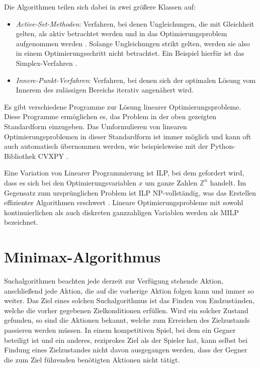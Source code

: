 Die Algorithmen teilen sich dabei in zwei größere Klassen auf:

\begin{itemize}
    \item \emph{Active-Set-Methoden}: Verfahren, bei denen Ungleichungen, die mit Gleichheit gelten, als aktiv betrachtet werden und in das Optimierungsproblem aufgenommen werden \cite[S. 243]{2023.OptimizationLectureNotes}. Solange Ungleichungen strikt gelten, werden sie also in einem Optimierungsschritt nicht betrachtet. Ein Beispiel hierfür ist das Simplex-Verfahren \cite[S. 248]{2023.OptimizationLectureNotes}.
    \item \emph{Innere-Punkt-Verfahren}: Verfahren, bei denen sich der optimalen Lösung vom Innerem des zulässigen Bereichs iterativ angenähert wird. \cite[S. 261]{2023.InteriorPoint}
\end{itemize}

Es gibt verschiedene Programme zur Lösung linearer Optimierungsprobleme. Diese Programme ermöglichen es, das Problem in der oben gezeigten Standardform einzugeben. Das Umformulieren von linearen Optimierungsproblemen in dieser Standardform ist immer möglich und kann oft auch automatisch übernommen werden, wie beispielsweise mit der Python-Bibliothek CVXPY \cite[S. 1]{2016.CVXPY}.

Eine Variation von Linearer Programmierung ist \ac{ILP}, bei dem gefordert wird, dass es sich bei den Optimierungsvariablen $x$ um ganze Zahlen $\mathbb{Z}^{n}$ handelt. Im Gegensatz zum ursprünglichen Problem ist \ac{ILP} NP-vollständig, was das Erstellen effizienter Algorithmen erschwert \cite[S. 173]{2002.MathProgramming}. Lineare Optimierungsprobleme mit sowohl kontinuierlichen als auch diskreten ganzzahligen Variablen werden als \ac{MILP} bezeichnet.

\section{Minimax-Algorithmus}
\label{chapter:minimax-algorithmus}

Suchalgorithmen beachten jede derzeit zur Verfügung stehende Aktion, anschließend jede Aktion, die auf die vorherige Aktion folgen kann und immer so weiter. Das Ziel eines solchen Suchalgorithmus ist das Finden von Endzuständen, welche die vorher gegebenen Zielkonditionen erfüllen. Wird ein solcher Zustand gefunden, so sind die Aktionen bekannt, welche zum Erreichen des Zielzustands passieren werden müssen. In einem kompetitiven Spiel, bei dem ein Gegner beteiligt ist und ein anderes, reziprokes Ziel als der Spieler hat, kann selbst bei Findung eines Zielzustandes nicht davon ausgegangen werden, dass der Gegner die zum Ziel führenden benötigten Aktionen nicht tätigt.

